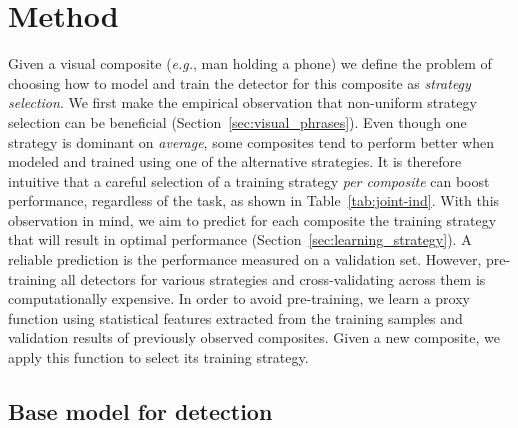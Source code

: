 \documentclass[runningheads]{llncs}
\makeatletter
\newcommand*{\eg}{{\em e.g.}\@\xspace}
\makeatother
\begin{document}
\section{Method}

Given a visual composite (\eg, man holding a phone) we define the problem of choosing how to model and train the detector for this composite as {\em strategy selection}. We first make the empirical observation that non-uniform strategy selection can be beneficial (Section~\ref{sec:visual_phrases}). Even though one strategy is dominant on {\em average}, some composites tend to perform better when modeled and trained using one of the alternative strategies. It is therefore intuitive that a careful selection of a training strategy {\em per composite} can boost performance, regardless of the task, as shown in Table~\ref{tab:joint-ind}. With this observation in mind, we aim to predict for each composite the training strategy that will result in optimal performance (Section~\ref{sec:learning_strategy}). A reliable prediction is the performance measured on a validation set. However, pre-training all detectors for various strategies and cross-validating across them is computationally expensive.
In order to avoid pre-training, we learn a proxy function using statistical features extracted from the training samples and validation results of previously observed composites. Given a new composite, we apply this function to select its training strategy. 

\vspace{-0.2cm}
\subsection{Base model for detection}
\end{document}
